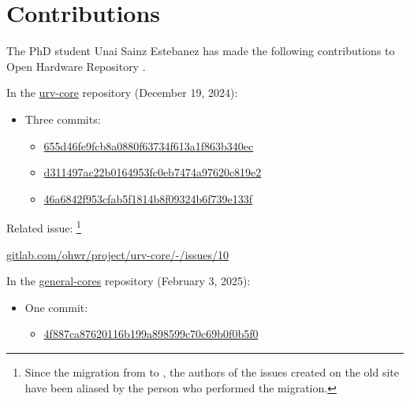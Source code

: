 \section{Contributions}
\label{contrib}

\noindent The PhD student Unai Sainz Estebanez has made the following contributions to Open Hardware Repository \cite{ohwr}.

\vspace{5mm}

\noindent In the \href{https://gitlab.com/ohwr/project/urv-core}{urv-core} repository (December 19, 2024):

\begin{itemize}
\item Three commits:
    \begin{itemize}
    \item \href{https://gitlab.com/ohwr/project/urv-core/-/commit/655d46fe9fcb8a0880f63734f613a1f863b340ec}{655d46fe9fcb8a0880f63734f613a1f863b340ec}
    \item \href{https://gitlab.com/ohwr/project/urv-core/-/commit/d311497ac22b0164953fc0eb7474a97620c819e2}{d311497ac22b0164953fc0eb7474a97620c819e2}
    \item \href{https://gitlab.com/ohwr/project/urv-core/-/commit/46a6842f953cfab5f1814b8f09324b6f739e133f}{46a6842f953cfab5f1814b8f09324b6f739e133f}
    \end{itemize}
\end{itemize}

\noindent Related issue: \footnote{Since the migration from  to , the authors of the issues created on the old site have been aliased by the person who performed the migration.}

\vspace{5mm}

\href{https://gitlab.com/ohwr/project/urv-core/-/issues/10}{gitlab.com/ohwr/project/urv-core/-/issues/10}

\vspace{5mm}

\noindent In the \href{https://gitlab.com/ohwr/project/general-cores/}{general-cores} repository (February 3, 2025):

\begin{itemize}
\item One commit:
    \begin{itemize}
    \item \href{https://gitlab.com/ohwr/project/general-cores/-/commit/4f887ca87620116b199a898599c70c69b0f0b5f0}{4f887ca87620116b199a898599c70c69b0f0b5f0}
    \end{itemize}
\end{itemize}

